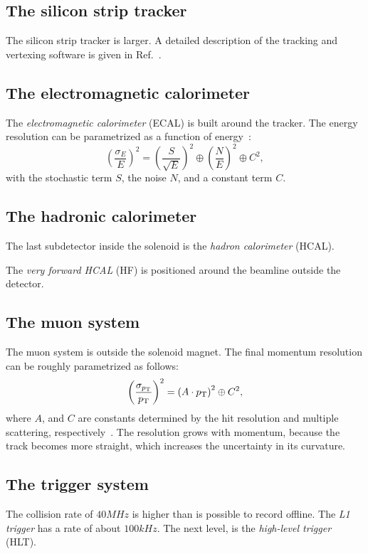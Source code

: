 \subsection{The silicon strip tracker}
The silicon strip tracker is larger.
A detailed description of the tracking and vertexing software is given in Ref.~\cite{CMS_vertex}.

\subsection{The electromagnetic calorimeter}
The \emph{electromagnetic calorimeter} (ECAL) is built around the tracker.
The energy resolution can be parametrized as a function of energy~\cite{CMS}:
\begin{equation}
  \left(\frac{\sigma_E}{E}\right)^2 = \left(\frac{S}{\sqrt{E}}\right)^2 \oplus \left(\frac{N}{E}\right)^2 \oplus C^2,
\end{equation}
with the stochastic term $S$, the noise $N$, and a constant term $C$.

\subsection{The hadronic calorimeter}
The last subdetector inside the solenoid is the \emph{hadron calorimeter} (HCAL).

The \emph{very forward HCAL} (HF) is positioned around the beamline outside the detector.

\subsection{The muon system}
The muon system is outside the solenoid magnet.
The final momentum resolution can be roughly parametrized as follows:
\begin{equation}
  \left(\frac{\sigma_{p_\text{T}}}{p_\text{T}}\right)^2 = \left(A\cdot p_\text{T}\right)^2 \oplus C^2,
\end{equation}
where $A$, and $C$ are constants determined by the hit resolution and multiple scattering, respectively~\cite{CMS_muon_resolution_thesis}. The resolution grows with momentum, because the track becomes more straight, which increases the uncertainty in its curvature.

\subsection{The trigger system}\label{sec:trigger}
The collision rate of $40\unit{MHz}$ is higher than is possible to record offline.
The \emph{L1 trigger} has a rate of about $100\unit{kHz}$.
The next level, is the \emph{high-level trigger} (HLT).


